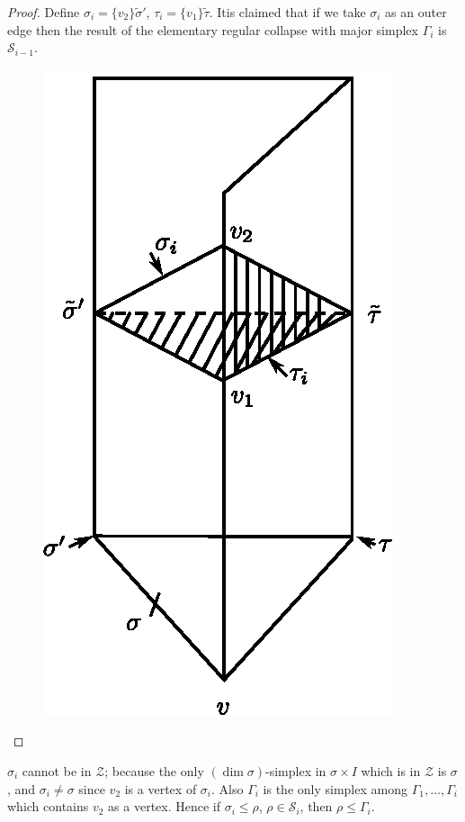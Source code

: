 \begin{proof}
Define $\sigma_{i}=\{v_{2}\}\tilde{\sigma}'$, $\tau_{i}=\{v_{1}\}\tilde{\tau}$. It\pageoriginale is claimed that if we take $\sigma_{i}$ as an outer edge then the result of the elementary regular collapse with major simplex $\Gamma_{i}$ is $\mathscr{S}_{i-1}$. 
\begin{figure}[H]
\centering
\includegraphics{figure/fig19.eps}
\end{figure}
\end{proof}

$\sigma_{i}$ cannot be in $\mathscr{Z}$; because the only $(\dim\sigma)$-simplex in $\sigma\times I$ which is in $\mathscr{Z}$ is $\sigma$, and $\sigma_{i}\neq \sigma$ since $v_{2}$ is a vertex of $\sigma_{i}$. Also $\Gamma_{i}$ is the only simplex among $\Gamma_{1},\ldots,\Gamma_{i}$ which contains $v_{2}$ as a vertex. Hence if $\sigma_{i}\leq \rho$, $\rho\in \mathscr{S}_{i}$, then $\rho\leq \Gamma_{i}$. 

